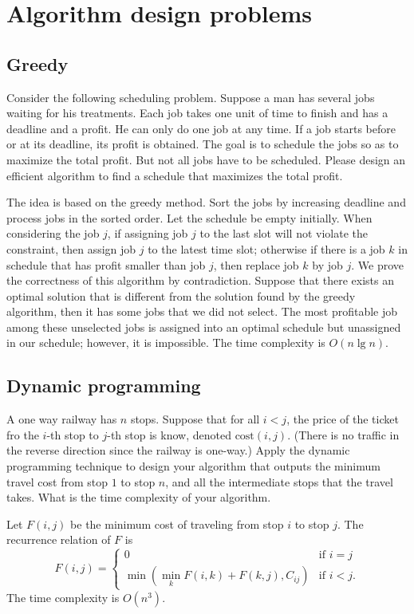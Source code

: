 \chapter{Algorithm design problems}

\section{Greedy}
\begin{Exercise}[origin={NTU CSIE 97, NTNU CSIE 97}]
Consider the following scheduling problem. Suppose a man has several jobs waiting for his treatments. Each job takes one unit of time to finish and has a deadline and a profit. He can only do one job at any time. If a job starts before or at its deadline, its profit is obtained. The goal is to schedule the jobs so as to maximize the total profit. But not all jobs have to be scheduled. Please design an efficient algorithm to find a schedule that maximizes the total profit.
\end{Exercise}
\begin{Answer}
The idea is based on the greedy method. Sort the jobs by increasing deadline and process jobs in the sorted order.
Let the schedule be empty initially. When considering the job $j$, if assigning job $j$ to the last slot will not violate the constraint, then assign job $j$ to the latest time slot; otherwise if there is a job $k$ in schedule that has profit smaller than job $j$, then replace job $k$ by job $j$. We prove the correctness of this algorithm by contradiction. Suppose that there exists an optimal solution that is different from the solution found by the greedy algorithm, then it has some jobs that we did not select. The most profitable job among these unselected jobs is assigned into an optimal schedule but unassigned in our schedule; however, it is impossible. The time complexity is $O(n \lg n)$.
\end{Answer}


\section{Dynamic programming}
\begin{Exercise}[origin={CYCU CSIE 90}]
A one way railway has $n$ stops. Suppose that for all $i < j$, the price of the ticket fro the $i$-th stop to $j$-th stop is know, denoted $\text{cost}(i, j)$. (There is no traffic in the reverse direction since the railway is one-way.) Apply the dynamic programming technique to design your algorithm that outputs the minimum travel cost from stop $1$ to stop $n$, and all the intermediate stops that the travel takes. What is the time complexity of your algorithm.
\end{Exercise}
\begin{Answer}
Let $F(i, j)$ be the minimum cost of traveling from stop $i$ to stop $j$. The recurrence relation of $F$ is 
\[ F(i, j) = 
   \begin{cases}
    0 & \text{if } i = j \\
    \min( \min_k F(i, k) + F(k, j), C_{ij}) & \text{if } i < j.
    \end{cases} \]
The time complexity is $O(n^3)$.
\end{Answer}

